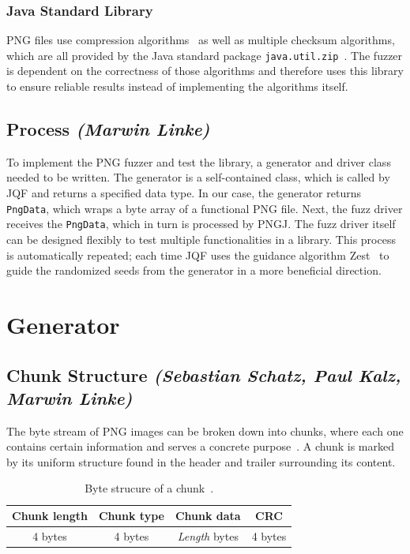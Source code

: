 \documentclass[runningheads]{llncs}
\begin{document}
\subsubsection{Java Standard Library}
PNG files use compression algorithms~\cite{rfc_deflate_compression} as well as multiple checksum algorithms, which are all provided by the Java standard package \texttt{java.util.zip}~\cite{java_util_zip_docs}. The fuzzer is dependent on the correctness of those algorithms and therefore uses this library to ensure reliable results instead of implementing the algorithms itself.
\subsection{Process \normalfont\textit{(Marwin Linke)}}
To implement the PNG fuzzer and test the library, a generator and driver class needed to be written. The generator is a self-contained class, which is called by JQF and returns a specified data type. In our case, the generator returns \texttt{PngData}, which wraps a byte array of a functional PNG file. Next, the fuzz driver receives the \texttt{PngData}, which in turn is processed by PNGJ. The fuzz driver itself can be designed flexibly to test multiple functionalities in a library. This process is automatically repeated; each time JQF uses the guidance algorithm Zest~\cite{zest_guidance} to guide the randomized seeds from the generator in a more beneficial direction.
\section{Generator}
\label{generator}
\subsection{Chunk Structure \normalfont\textit{(Sebastian Schatz, Paul Kalz, Marwin Linke)}}
\label{chunk_structure}
The byte stream of PNG images can be broken down into chunks, where each one contains certain information and serves a concrete purpose~\cite{libpng_chunks}. A chunk is marked by its uniform structure found in the header and trailer surrounding its content.
\bgroup
\def\arraystretch{1.5}
\setlength\tabcolsep{1.5ex}
    \begin{table}
        \caption{Byte strucure of a chunk~\cite{libpng_file_structure}.}
        \label{tab1}
        \begin{center}
            \begin{tabular}{|c|c|c|c|}
                \hline 
                \textbf{Chunk length} & \textbf{Chunk type} & \textbf{Chunk data} & \textbf{CRC} \\
                \hline \hline
                4 bytes               & 4 bytes             & \textit{Length} bytes        & 4 bytes \\
                \hline
            \end{tabular}              
        \end{center}
    \end{table}
\egroup
\end{document}
